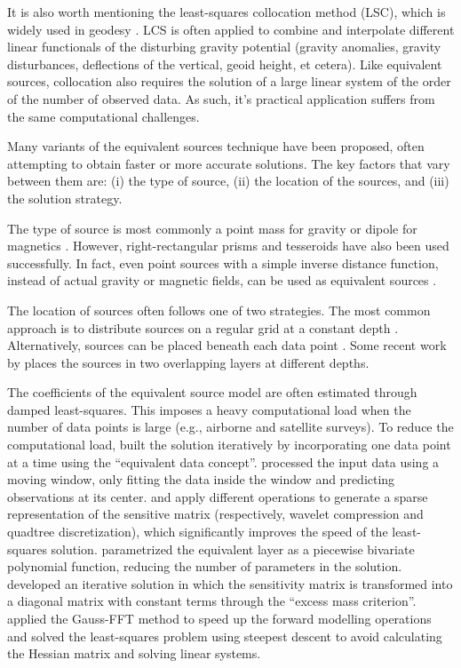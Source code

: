 It is also worth mentioning the least-squares collocation method
(LSC), which is widely used in geodesy
\citep[][and references therein]{tscherning2015}.
LCS is often applied to combine and interpolate different linear functionals of
the disturbing gravity potential (gravity anomalies, gravity disturbances,
deflections of the vertical, geoid height, et cetera).
Like equivalent sources, collocation also requires the solution of a large
linear system of the order of the number of observed data.
As such, it's practical application suffers from the same computational
challenges.

Many variants of the equivalent sources technique have been proposed, often
attempting to obtain faster or more accurate solutions.
The key factors that vary between them are: (i) the type of source, (ii)
the location of the sources, and (iii) the solution strategy.

The type of source is most commonly a point mass for gravity or dipole for
magnetics \citep[e.g.,~][]{vonfrese1981, silva1986, mendonca1994, siqueira2017}.
However, right-rectangular prisms \citep[e.g.,][]{barnes2011, jirigalatu2019,
li2020} and tesseroids \citep{bouman2016} have also been used successfully.
In fact, even point sources with a simple inverse distance function, instead of
actual gravity or magnetic fields, can be used as
equivalent sources \citep{cordell1992}.

The location of sources often follows one of two strategies.
The most common approach is to distribute sources on a regular grid at a
constant depth \citep[e.g.,~][]{leao1989, barnes2011, oliveira2013}.
Alternatively, sources can be placed beneath each data point
\citep[e.g.,~][]{cordell1992, siqueira2017}.
Some recent work by \citet{li2020} places the sources in two overlapping layers
at different depths.

The coefficients of the equivalent source model are often estimated through
damped least-squares.
This imposes a heavy computational load when the number of data points is
large (e.g., airborne and satellite surveys).
To reduce the computational load, \citet{mendonca1994} built the solution
iteratively by incorporating one data point at a time using the ``equivalent
data concept''.
\citet{leao1989} processed the input data using a moving window, only fitting the
data inside the window and predicting observations at its center.
\citet{li2010} and \citet{barnes2011} apply different operations to generate a
sparse representation of the sensitive matrix (respectively, wavelet
compression and quadtree discretization), which significantly improves the
speed of the least-squares solution.
\citet{oliveira2013} parametrized the equivalent layer as a piecewise bivariate
polynomial function, reducing the number of parameters in the solution.
\citet{siqueira2017} developed an iterative solution in which the sensitivity
matrix is transformed into a diagonal matrix with constant terms through the
``excess mass criterion''.
\citet{jirigalatu2019} applied the Gauss-FFT method to speed up the forward
modelling operations and solved the least-squares problem using steepest
descent to avoid calculating the Hessian matrix and solving linear systems.

